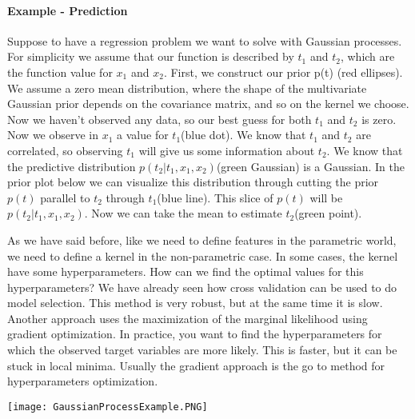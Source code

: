 \documentclass[main.tex]{subfiles}
\begin{document}
\paragraph{Example - Prediction} Suppose to have a regression problem we want to solve with Gaussian processes. For simplicity we assume that our function is described by $t_1$ and $t_2$, which are the function value for $x_1$ and $x_2$. 
First, we construct our prior p(t) (red ellipses). We assume a zero mean distribution, where the shape of the multivariate Gaussian prior depends on the covariance matrix, and so on the kernel we choose. Now we haven't observed any data, so our best guess for both $t_1$ and $t_2$ is zero. Now we observe in $x_1$ a value for $t_1$(blue dot). We know that $t_1$ and $t_2$ are correlated, so observing $t_1$ will give us some information about $t_2$. We know that the predictive distribution $p(t_2|t_1, x_1, x_2)$(green Gaussian) is a Gaussian. In the prior plot below we can visualize this distribution through cutting the prior $p(t)$ parallel to $t_2$ through $t_1$(blue line). This slice of $p(t)$ will be $p(t_2|t_1, x_1, x_2)$. Now we can take the mean to estimate $t_2$(green point).

As we have said before, like we need to define features in the parametric world, we need to define a kernel in the non-parametric case. In some cases, the kernel have some hyperparameters. How can we find the optimal values for this hyperparameters?
We have already seen how cross validation can be used to do model selection. This method is very robust, but at the same time it is slow. Another approach uses the maximization of the marginal likelihood using gradient optimization. In practice, you want to find the hyperparameters for which the observed target variables are more likely. This is faster, but it can be stuck in local minima. Usually the gradient approach is the go to method for hyperparameters optimization.
\begin{center}
    \texttt{[image: GaussianProcessExample.PNG]}
\end{center}

\newpage
\end{document}
